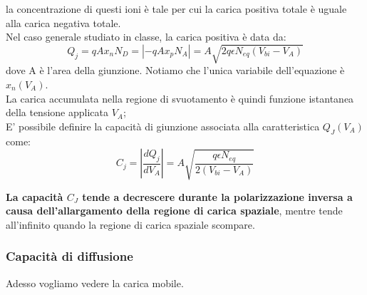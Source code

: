 la concentrazione di questi ioni è tale per cui la carica positiva totale è uguale alla carica negativa totale.\\
Nel caso generale studiato in classe, la carica positiva è data da:
\begin{equation}
    Q_j = qAx_n N_D=|-qAx_p N_A|=A\sqrt{2q\epsilon N_{eq}(V_{bi}-V_A)}
\end{equation}
dove A è l'area della giunzione. Notiamo che l'unica variabile dell'equazione è $x_n(V_A)$.\\
La carica accumulata nella regione di svuotamento è quindi funzione istantanea della tensione applicata $V_A$; \\
E' possibile definire la capacità di giunzione associata alla caratteristica $Q_J (V_A) $ come:
\begin{equation}
    C_j=\left| \dfrac{dQ_j}{dV_A}\right|=A\sqrt{\dfrac{q\epsilon N_{eq}}{2(V_{bi}-V_A)}}
\end{equation}

\textbf{La capacità $C_J$ tende a decrescere durante la polarizzazione inversa a causa dell'allargamento della regione di carica spaziale}, mentre tende all'infinito quando la regione di carica spaziale scompare.

\begin{center}
\end{center}

\subsubsection*{Capacità di diffusione}
Adesso vogliamo vedere la carica mobile.\\


